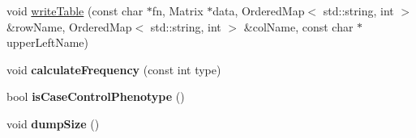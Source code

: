\begin{DoxyCompactItemize}
\item 
void \hyperlink{classVCFData_a1440087740630d905f1d93bbcf041726}{write\-Table} (const char $\ast$fn, Matrix $\ast$data, Ordered\-Map$<$ std\-::string, int $>$ \&row\-Name, Ordered\-Map$<$ std\-::string, int $>$ \&col\-Name, const char $\ast$upper\-Left\-Name)
\item 
\hypertarget{classVCFData_a645ad7d81cdf4896d98689ae46c4bd09}{void {\bfseries calculate\-Frequency} (const int type)}\label{classVCFData_a645ad7d81cdf4896d98689ae46c4bd09}

\item 
\hypertarget{classVCFData_a7f27883257e2a548c59c2da734bfcbc7}{bool {\bfseries is\-Case\-Control\-Phenotype} ()}\label{classVCFData_a7f27883257e2a548c59c2da734bfcbc7}

\item 
\hypertarget{classVCFData_aa48f49b02d0ba948a40aef0106a6d47d}{void {\bfseries dump\-Size} ()}\label{classVCFData_aa48f49b02d0ba948a40aef0106a6d47d}

\end{DoxyCompactItemize}
